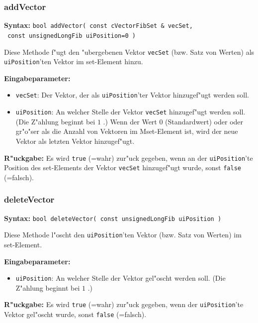 \subsubsection{addVector}

\textbf{Syntax:} \verb|bool addVector( const cVectorFibSet & vecSet,| \\\verb| const unsignedLongFib uiPosition=0 )|

\bigskip\noindent
Diese Methode f"ugt den "ubergebenen Vektor \verb|vecSet| (bzw. Satz von Werten) als \verb|uiPosition|'ten Vektor im set-Element hinzu.

\bigskip\noindent
\textbf{Eingabeparameter:}
\begin{itemize}
 \item \verb|vecSet|: Der Vektor, der als \verb|uiPosition|'ter Vektor hinzugef"ugt werden soll.
 \item \verb|uiPosition|: An welcher Stelle der Vektor \verb|vecSet| hinzugef"ugt werden soll. (Die Z"ahlung beginnt bei $1$ .) Wenn der Wert $0$ (Standardwert) oder oder gr"o"ser als die Anzahl von Vektoren im Mset-Element ist, wird der neue Vektor als letzten Vektor hinzugef"ugt.
\end{itemize}

\bigskip\noindent
\textbf{R"uckgabe:} Es wird \verb|true| (=wahr) zur"uck gegeben, wenn an der \verb|uiPosition|'te Position des set-Elements der Vektor \verb|vecSet| hinzugef"ugt wurde, sonst \verb|false| (=falsch).


\subsubsection{deleteVector}

\textbf{Syntax:} \verb|bool deleteVector( const unsignedLongFib uiPosition )|

\bigskip\noindent
Diese Methode l"oscht den \verb|uiPosition|'ten Vektor (bzw. Satz von Werten) im set-Element.

\bigskip\noindent
\textbf{Eingabeparameter:}
\begin{itemize}
 \item \verb|uiPosition|: An welcher Stelle der Vektor gel"oscht werden soll. (Die Z"ahlung beginnt bei $1$ .)
\end{itemize}

\bigskip\noindent
\textbf{R"uckgabe:} Es wird \verb|true| (=wahr) zur"uck gegeben, wenn der \verb|uiPosition|'te Vektor gel"oscht wurde, sonst \verb|false| (=falsch).



